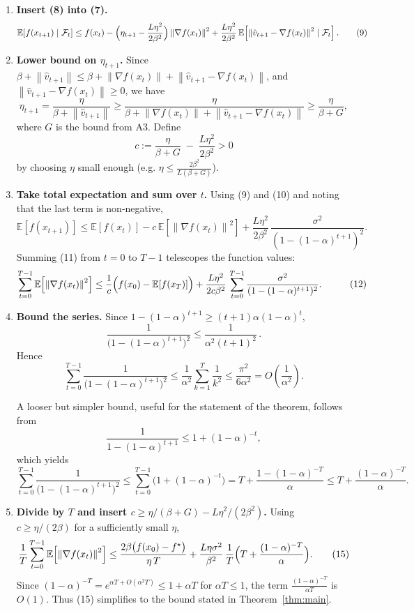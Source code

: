 \documentclass{article}
\newcommand{\E}{\mathbb{E}}
\newcommand{\norm}[1]{\left\|#1\right\|}
\newcommand{\grad}{\nabla}
\begin{document}
\begin{enumerate}[label=[Step \arabic*]]
\item \textbf{Insert (8) into (7).}
\[
\E\!\left[f(x_{t+1})\mid\mathcal{F}_t\right]
\le f(x_t)-\Bigl(\eta_{t+1}-\frac{L\eta^2}{2\beta^2}\Bigr)\norm{\grad f(x_t)}^2
+\frac{L\eta^2}{2\beta^2}\,
\E\!\left[\norm{\hat v_{t+1}-\grad f(x_t)}^2\mid\mathcal{F}_t\right].
\tag{9}
\]

\item \textbf{Lower bound on $\eta_{t+1}$.}  
Since $\beta+\norm{\hat v_{t+1}}\le \beta+\norm{\grad f(x_t)}+\norm{\hat v_{t+1}-\grad f(x_t)}$,
and $\norm{\hat v_{t+1}-\grad f(x_t)}\ge0$, we have
\[
\eta_{t+1} = \frac{\eta}{\beta+\norm{\hat v_{t+1}}}\ge \frac{\eta}{\beta+\norm{\grad f(x_t)}+ \norm{\hat v_{t+1}-\grad f(x_t)}}\ge
\frac{\eta}{\beta+G},
\]
where $G$ is the bound from A3. Define
\[
c:=\frac{\eta}{\beta+G}\;-\;\frac{L\eta^2}{2\beta^2}>0
\tag{10}
\]
by choosing $\eta$ small enough (e.g. $\eta\le\frac{2\beta^2}{L(\beta+G)}$).

\item \textbf{Take total expectation and sum over $t$.}  
Using (9) and (10) and noting that the last term is non‑negative,
\[
\E\!\left[f(x_{t+1})\right]\le \E\!\left[f(x_t)\right]-c\,\E\!\left[\norm{\grad f(x_t)}^2\right]
+\frac{L\eta^2}{2\beta^2}\,
\frac{\sigma^2}{(1-(1-\alpha)^{t+1})^2}.
\tag{11}
\]
Summing (11) from $t=0$ to $T-1$ telescopes the function values:
\[
\begin{aligned}
\sum_{t=0}^{T-1}\E\!\left[\norm{\grad f(x_t)}^2\right]
&\le \frac{1}{c}\Bigl(f(x_0)-\E[f(x_T)]\Bigr)
+ \frac{L\eta^2}{2c\beta^2}\,
\sum_{t=0}^{T-1}\frac{\sigma^2}{(1-(1-\alpha)^{t+1})^2}.
\end{aligned}
\tag{12}
\]

\item \textbf{Bound the series.}  
Since $1-(1-\alpha)^{t+1}\ge (t+1)\alpha(1-\alpha)^{t}$,
\[
\frac{1}{\bigl(1-(1-\alpha)^{t+1}\bigr)^2}\le
\frac{1}{\alpha^2(t+1)^2}\, .
\]
Hence
\[
\sum_{t=0}^{T-1}\frac{1}{\bigl(1-(1-\alpha)^{t+1}\bigr)^2}
\le \frac{1}{\alpha^2}\sum_{k=1}^{T}\frac{1}{k^2}
\le \frac{\pi^2}{6\alpha^2}=O\!\left(\frac{1}{\alpha^2}\right).
\tag{13}
\]

A looser but simpler bound, useful for the statement of the theorem, follows
from
\[
\frac{1}{1-(1-\alpha)^{t+1}}\le 1+(1-\alpha)^{-t},
\]
which yields
\[
\sum_{t=0}^{T-1}\frac{1}{\bigl(1-(1-\alpha)^{t+1}\bigr)^2}
\le \sum_{t=0}^{T-1}\bigl(1+(1-\alpha)^{-t}\bigr)
= T+\frac{1-(1-\alpha)^{-T}}{\alpha}
\le T+\frac{(1-\alpha)^{-T}}{\alpha}.
\tag{14}
\]

\item \textbf{Divide by $T$ and insert $c\ge\eta/( \beta+G)-L\eta^2/(2\beta^2)$.}  
Using $c\ge \eta/(2\beta)$ for a sufficiently small $\eta$,
\[
\frac{1}{T}\sum_{t=0}^{T-1}\E\!\left[\norm{\grad f(x_t)}^2\right]
\le \frac{2\beta\bigl(f(x_0)-f^\star\bigr)}{\eta\,T}
+\frac{L\eta\sigma^2}{\beta^2}\,
\frac{1}{T}\Bigl(T+\frac{(1-\alpha)^{-T}}{\alpha}\Bigr).
\tag{15}
\]
Since $(1-\alpha)^{-T}=e^{\alpha T+O(\alpha^2 T)}\le 1+\alpha T$ for
$\alpha T\le1$, the term $\frac{(1-\alpha)^{-T}}{\alpha T}$ is $O(1)$.
Thus (15) simplifies to the bound stated in Theorem~\ref{thm:main}.


\end{enumerate}
\end{document}
